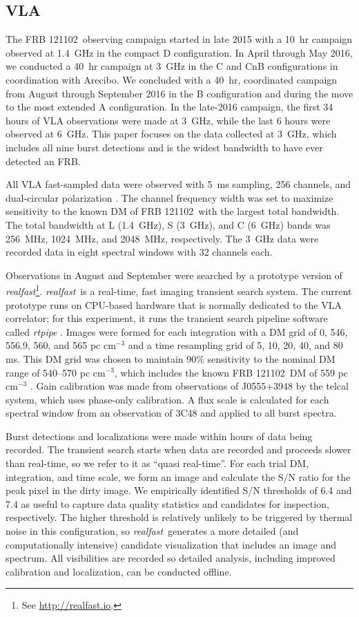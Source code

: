 \documentclass[twocolumn]{aastex61}
\newcommand{\rf}{\emph{realfast}}
\newcommand{\frb}{FRB 121102}
\begin{document}
\subsection{VLA}

The \frb\ observing campaign started in late 2015 with a 10~hr campaign observed at 1.4~GHz in the compact D configuration. In April through May 2016, we conducted a 40~hr campaign at 3~GHz in the C and CnB configurations in coordination with Arecibo. We concluded with a 40~hr, coordinated campaign from August through September 2016 in the B configuration and during the move to the most extended A configuration. In the late-2016 campaign, the first 34 hours of VLA observations were made at 3~GHz, while the last 6 hours were observed at 6~GHz. This paper focuses on the data collected at 3~GHz, which includes all nine burst detections and is the widest bandwidth to have ever detected an FRB.

All VLA fast-sampled data were observed with 5~ms sampling, 256 channels, and dual-circular polarization \citep{2015ApJ...807...16L}. The channel frequency width was set to maximize sensitivity to the known DM of \frb\ with the largest total bandwidth. The total bandwidth at L (1.4~GHz), S (3~GHz), and C (6~GHz) bands was 256~MHz, 1024~MHz, and 2048~MHz, respectively. The 3~GHz data were recorded data in eight spectral windows with 32 channels each.

Observations in August and September were searched by a prototype version of \rf\footnote{See \url{http://realfast.io}.}. \rf\ is a real-time, fast imaging transient search system. The current prototype runs on CPU-based hardware that is normally dedicated to the VLA correlator; for this experiment, it runs the transient search pipeline software called \emph{rtpipe} \citep[\url{https://github.com/caseyjlaw/rtpipe};][]{2015ApJ...807...16L}. Images were formed for each integration with a DM grid of 0, 546, 556.9, 560, and 565 pc cm$^{-3}$ and a time resampling grid of 5, 10, 20, 40, and 80 ms. This DM grid was chosen to maintain 90\% sensitivity to the nominal DM range of 540--570 pc cm$^{-3}$, which includes the known \frb\ DM of 559 pc cm$^{-3}$ \citep{2016arXiv160308880S}. Gain calibration was made from observations of J0555+3948 by the telcal system, which uses phase-only calibration. A flux scale is calculated for each spectral window from an observation of 3C48 and applied to all burst spectra.

Burst detections and localizations were made within hours of data being recorded. The transient search starts when data are recorded and proceeds slower than real-time, so we refer to it as ``quasi real-time''. For each trial DM, integration, and time scale, we form an image and calculate the S/N ratio for the peak pixel in the dirty image. We empirically identified S/N thresholds of 6.4 and 7.4 as useful to capture data quality statistics and candidates for inspection, respectively. The higher threshold is relatively unlikely to be triggered by thermal noise in this configuration, so \rf\ generates a more detailed (and computationally intensive) candidate visualization that includes an image and spectrum. All visibilities are recorded so detailed analysis, including improved calibration and localization, can be conducted offline. 
\end{document}
